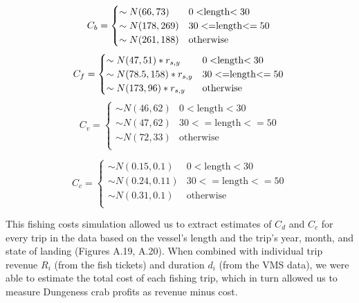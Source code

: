 \documentclass[]{elsarticle} %
\begin{document}
\begin{equation}
  C_b =
    \begin{cases}
      \sim N(66,73) & \text{$0<$length$<30$}\\
      \sim N(178,269) & \text{$30<=$length$<=50$}\\
      \sim N(261,188) & \text{otherwise}\\
    \end{cases}\\
\end{equation} \begin{equation}
  C_f =
    \begin{cases}
      \sim N(47,51)*r_{s,y} & \text{$0<$length$<30$}\\
      \sim N(78.5,158)*r_{s,y} & \text{$30<=$length$<=50$}\\
      \sim N(173,96)*r_{s,y} & \text{otherwise}\\
    \end{cases}\\
\end{equation} \begin{equation}
  C_v =
    \begin{cases}
      \sim N(46,62) & \text{$0<$length$<30$}\\
      \sim N(47,62) & \text{$30<=$length$<=50$}\\
      \sim N(72,33) & \text{otherwise}\\
    \end{cases}
\end{equation}

\begin{equation}
  C_c = 
  \begin{cases}
      \sim N(0.15,0.1) & \text{$0<$length$<30$}\\
      \sim N(0.24,0.11) & \text{$30<=$length$<=50$}\\
      \sim N(0.31,0.1) & \text{otherwise}\\
  \end{cases}
\end{equation}

This fishing costs simulation allowed us to extract estimates of \(C_d\)
and \(C_c\) for every trip in the data based on the vessel's length and
the trip's year, month, and state of landing (Figures A.19, A.20). When
combined with individual trip revenue \(R_i\) (from the fish tickets)
and duration \(d_i\) (from the VMS data), we were able to estimate the
total cost of each fishing trip, which in turn allowed us to measure
Dungeness crab profits as revenue minus cost.
\end{document}
